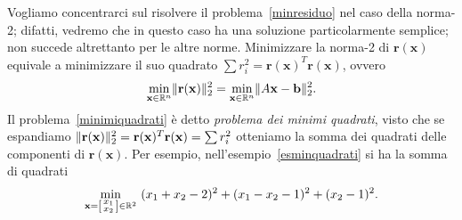 \documentclass[a4paper]{report}
\DeclarePairedDelimiter{\norm}{\lVert}{\rVert}
\theoremstyle{definiton}
\theoremstyle{remark}
\newcommand{\x}{\mathbf{x}}
\renewcommand{\b}{\mathbf{b}}
\begin{document}
Vogliamo concentrarci sul risolvere il problema~\eqref{minresiduo} nel caso della norma-2; difatti, vedremo che in questo caso ha una soluzione particolarmente semplice; non succede altrettanto per le altre norme. Minimizzare la norma-2 di $\mathbf{r}(\x)$ equivale a minimizzare il suo quadrato $\sum r_i^2  = \mathbf{r}(\x)^T\mathbf{r}(\x)$, ovvero
\begin{equation} \label{minimiquadrati}
    \min_{\x\in\mathbb{R}^n} \norm{\mathbf{r}(\x)}_2^2 = \min_{\x\in\mathbb{R}^n} \norm{A\x-\b}_2^2.
\end{equation}
Il problema~\eqref{minimiquadrati} è detto \emph{problema dei minimi quadrati}, visto che se espandiamo $\norm{\mathbf{r}(\x)}_2^2 = \mathbf{r}(\x)^T\mathbf{r}(\x) = \sum r_i^2$ otteniamo la somma dei quadrati delle componenti di $\mathbf{r}(\x)$. Per esempio, nell'esempio~\eqref{esminquadrati} si ha la somma di quadrati
\[
\min_{\x = \begin{bsmallmatrix}x_1\\x_2\end{bsmallmatrix} \in \mathbb{R}^2}\,\, (x_1 + x_2 - 2)^2 + (x_1 - x_2 - 1)^2 + (x_2 - 1)^2.
\]
\end{document}
